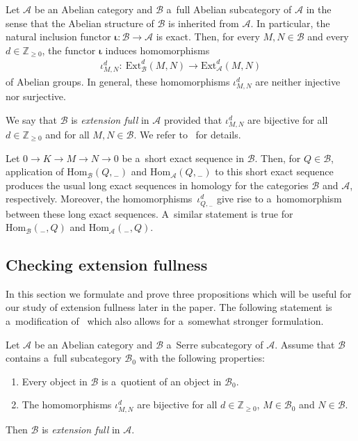 Let $\mathcal{A}$ be an Abelian category and $\mathcal{B}$ a~full Abelian subcategory of $\mathcal{A}$ in the sense that
the Abelian structure of $\mathcal{B}$ is inherited from $\mathcal{A}$.
In particular, the natural inclusion functor $\boldsymbol{\iota}:\mathcal{B}\to \mathcal{A}$ is exact.
Then, for every $M,N\in\mathcal{B}$ and every $d\in\mathbb{Z}_{\geq0}$, the functor $\boldsymbol{\iota}$ induces
homomorphisms
\begin{gather*}
\iota^d_{M,N}: \ \mathrm{Ext}_{\mathcal{B}}^d(M,N)\to \mathrm{Ext}_{\mathcal{A}}^d(M,N)
\end{gather*}
of Abelian groups.
In general, these homomorphisms $\iota^d_{M,N}$ are neither injective nor surjective.

We say that $\mathcal{B}$ is {\em extension full} in $\mathcal{A}$ provided that $\iota^d_{M,N}$ are bijective for all
$d\in\mathbb{Z}_{\geq0}$ and for all $M,N\in\mathcal{B}$.
We refer to~\cite[Section~2]{CoMa} for details.

Let $0\to K\to M\to N\to 0$ be a~short exact sequence in $\mathcal{B}$.
Then, for $Q\in \mathcal{B}$, application of $\mathrm{Hom}_{\mathcal{B}}(Q,{}_-)$ and
$\mathrm{Hom}_{\mathcal{A}}(Q,{}_-)$ to this short exact sequence produces the usual long exact sequences in homology
for the categories $\mathcal{B}$ and $\mathcal{A}$, respectively.
Moreover, the homomor\-phisms~$\iota^d_{Q,{}_-}$ give rise to a~homomorphism between these long exact sequences.
A~similar statement is true for $\mathrm{Hom}_{\mathcal{B}}({}_-,Q)$ and $\mathrm{Hom}_{\mathcal{A}}({}_-,Q)$.

\subsection{Checking extension fullness}%

In this section we formulate and prove three propositions which will be useful for our study of extension fullness later
in the paper.
The following statement is a~modif\/ication of~\cite[Lemma~4]{CoMa} which also allows for a~somewhat stronger formulation.

\begin{proposition}
\label{prop1}
Let $\mathcal{A}$ be an Abelian category and $\mathcal{B}$ a~Serre subcategory of $\mathcal{A}$.
Assume that $\mathcal{B}$ contains a~full subcategory $\mathcal{B}_0$ with the following properties:
\begin{enumerate}[$($a$)$]\itemsep=0pt
\item
\label{prop1.1}
Every object in $\mathcal{B}$ is a~quotient of an object in $\mathcal{B}_0$.
\item
\label{prop1.2}
The homomorphisms $\iota^d_{M,N}$ are bijective for all $d\in\mathbb{Z}_{\geq0}$, $M\in\mathcal{B}_0$ and
$N\in\mathcal{B}$.
\end{enumerate}
Then $\mathcal{B}$ is {\em extension full} in $\mathcal{A}$.
\end{proposition}

